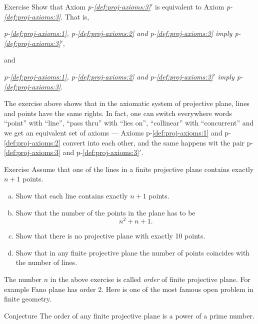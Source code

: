 \begin{thm}{Exercise}\label{ex:3=3'}
Show that Axiom {}\emph{p-\ref{def:proj-axioms:3}$'$} is equivalent to Axiom {}\emph{p-\ref{def:proj-axioms:3}}.
That is, 
\begin{center}
\emph{p-\ref{def:proj-axioms:1}, p-\ref{def:proj-axioms:2} and p-\ref{def:proj-axioms:3} imply  p-\ref{def:proj-axioms:3}$'$},
\end{center}
and 
\begin{center}
\emph{p-\ref{def:proj-axioms:1}, p-\ref{def:proj-axioms:2} and p-\ref{def:proj-axioms:3}$'$ imply p-\ref{def:proj-axioms:3}}.
\end{center}

\end{thm}

The exercise above shows that in the axiomatic system of projective plane,
lines and points have the same rights.
In fact, one can switch everywhere words ``point'' with ``line'', ``pass thru'' with ``lies on'', ``collinear'' with ``concurrent'' and we get an equivalent set of axioms ---  Axioms p-\ref{def:proj-axioms:1} and p-\ref{def:proj-axioms:2} convert into each other,
and the same happens wit the pair p-\ref{def:proj-axioms:3} and p-\ref{def:proj-axioms:3}$'$.

\begin{thm}{Exercise}\label{ex:oder}
Assume that one of the lines in a finite projective plane contains exactly $n+1$ points.
\begin{enumerate}[(a)]
\item\label{ex:oder:a} Show that each line contains exactly $n+1$ points.
\item\label{ex:oder:b} Show that the number of the points in the plane has to be 
\[n^2+n+1.\]
\item\label{ex:oder:c} Show that there is no projective plane with exactly 10 points.
\item\label{ex:oder:d} Show that in any finite projective plane the number of points coincides with the number of lines.
\end{enumerate}
\end{thm}

The number $n$ in the above exercise is called \emph{order} of finite projective plane.
For example Fano plane has order $2$.
Here is one of the most famous open problem in finite geometry.

\begin{thm}{Conjecture}
The order of any finite projective plane is a power of a prime number.
\end{thm}

